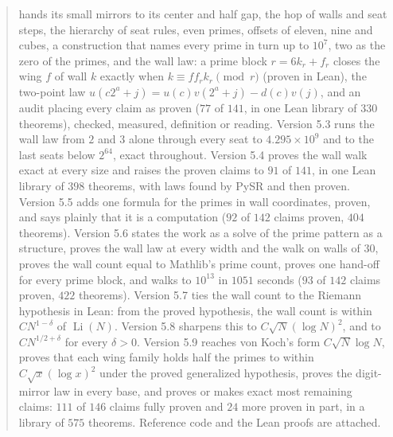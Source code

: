 \documentclass[11pt]{article}
\begin{document}
\begin{abstract}
hands its small mirrors to its center and half gap, the hop of walls and seat steps, the hierarchy of seat rules, even primes, offsets of eleven, nine and cubes, a construction that names every prime in turn up to $10^7$, two as the zero of the primes, and the wall law: a prime block $r = 6k_r+f_r$ closes the wing $f$ of wall $k$ exactly when $k\equiv f f_r k_r \pmod r$ (proven in Lean), the two-point law $u(c2^a+j) = u(c)v(2^a+j) - d(c)v(j)$, and an audit placing every claim as proven ($77$ of $141$, in one Lean library of $330$ theorems), checked, measured, definition or reading. Version 5.3 runs the wall law from $2$ and $3$ alone through every seat to $4.295\times10^9$ and to the last seats below $2^{64}$, exact throughout. Version 5.4 proves the wall walk exact at every size and raises the proven claims to $91$ of $141$, in one Lean library of $398$ theorems, with laws found by PySR and then proven. Version 5.5 adds one formula for the primes in wall coordinates, proven, and says plainly that it is a computation ($92$ of $142$ claims proven, $404$ theorems). Version 5.6 states the work as a solve of the prime pattern as a structure, proves the wall law at every width and the walk on walls of $30$, proves the wall count equal to Mathlib's prime count, proves one hand-off for every prime block, and walks to $10^{13}$ in $1051$ seconds ($93$ of $142$ claims proven, $422$ theorems). Version 5.7 ties the wall count to the Riemann hypothesis in Lean: from the proved hypothesis, the wall count is within $C N^{1-\delta}$ of $\operatorname{Li}(N)$. Version 5.8 sharpens this to $C\sqrt{N}(\log N)^2$, and to $C N^{1/2+\delta}$ for every $\delta>0$. Version 5.9 reaches von Koch's form $C\sqrt{N}\log N$, proves that each wing family holds half the primes to within $C\sqrt{x}(\log x)^2$ under the proved generalized hypothesis, proves the digit-mirror law in every base, and proves or makes exact most remaining claims: $111$ of $146$ claims fully proven and $24$ more proven in part, in a library of $575$ theorems. Reference code and the Lean proofs are attached.
\end{abstract}
\end{document}
